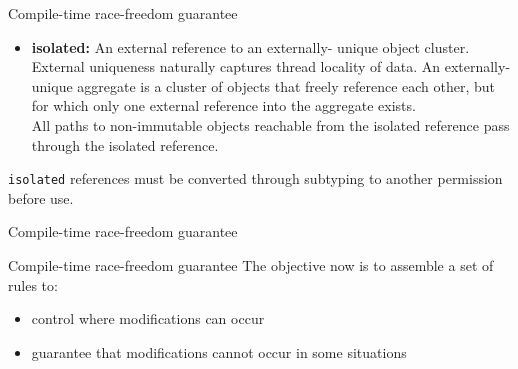 \documentclass{beamer}
\begin{document}
\begin{frame}{Compile-time race-freedom guarantee}
	\newcommand{\bb}{\only<2->{\color{blue}}}
	
	\begin{itemize}
	\item \textbf{isolated:} An external reference to an {\bb externally-
		  unique object cluster}. External uniqueness naturally captures
		  {\bb thread locality of data}. An externally-unique aggregate
		  is a cluster of objects that freely reference each other,
	      but for which {\bb only one external reference into the
	  	  aggregate exists}.\\
	  	  All paths to non-immutable objects reachable from the
	  	  isolated reference pass through the isolated reference.
	\end{itemize}
	\texttt{isolated} references must be converted through
	subtyping to another permission before use.
\end{frame}


\begin{frame}{Compile-time race-freedom guarantee}
	\begin{center}
	\end{center}
\end{frame}


\begin{frame}[fragile]{Compile-time race-freedom guarantee}
	The objective now is to assemble a set of rules to:
	\begin{itemize}
	\item control where modifications can occur
	\item guarantee that modifications cannot occur in some situations
	\end{itemize}
\end{frame}
\end{document}
